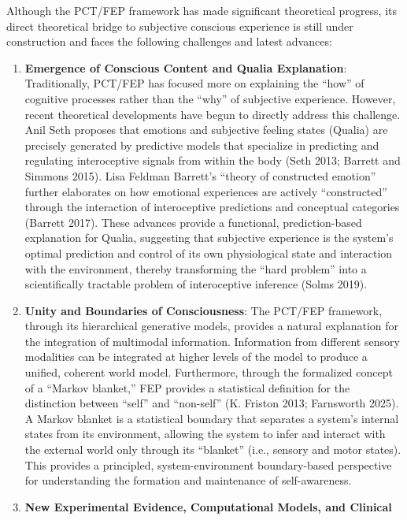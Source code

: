 \documentclass[
  a4paper]{article}
\begin{document}
Although the PCT/FEP framework has made significant theoretical
progress, its direct theoretical bridge to subjective conscious
experience is still under construction and faces the following
challenges and latest advances:

\begin{enumerate}
\def\labelenumi{\arabic{enumi}.}
\item
  \textbf{Emergence of Conscious Content and Qualia Explanation}:
  Traditionally, PCT/FEP has focused more on explaining the ``how'' of
  cognitive processes rather than the ``why'' of subjective experience.
  However, recent theoretical developments have begun to directly
  address this challenge. Anil Seth proposes that emotions and
  subjective feeling states (Qualia) are precisely generated by
  predictive models that specialize in predicting and regulating
  interoceptive signals from within the body (Seth 2013; Barrett and
  Simmons 2015). Lisa Feldman Barrett's ``theory of constructed
  emotion'' further elaborates on how emotional experiences are actively
  ``constructed'' through the interaction of interoceptive predictions
  and conceptual categories (Barrett 2017). These advances provide a
  functional, prediction-based explanation for Qualia, suggesting that
  subjective experience is the system's optimal prediction and control
  of its own physiological state and interaction with the environment,
  thereby transforming the ``hard problem'' into a scientifically
  tractable problem of interoceptive inference (Solms 2019).
\item
  \textbf{Unity and Boundaries of Consciousness}: The PCT/FEP framework,
  through its hierarchical generative models, provides a natural
  explanation for the integration of multimodal information. Information
  from different sensory modalities can be integrated at higher levels
  of the model to produce a unified, coherent world model. Furthermore,
  through the formalized concept of a ``Markov blanket,'' FEP provides a
  statistical definition for the distinction between ``self'' and
  ``non-self'' (K. Friston 2013; Farnsworth 2025). A Markov blanket is a
  statistical boundary that separates a system's internal states from
  its environment, allowing the system to infer and interact with the
  external world only through its ``blanket'' (i.e., sensory and motor
  states). This provides a principled, system-environment boundary-based
  perspective for understanding the formation and maintenance of
  self-awareness.
\item
  \textbf{New Experimental Evidence, Computational Models, and Clinical
}
\end{enumerate}
\end{document}
